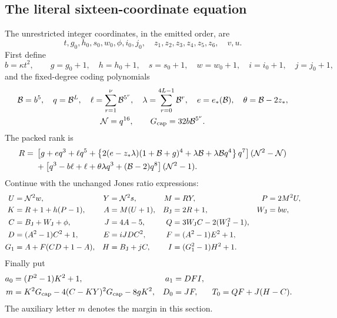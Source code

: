 \subsection{The literal sixteen-coordinate equation}

The unrestricted integer coordinates, in the emitted order, are
\begin{equation}
 t,g_0,h_0,s_0,w_0,\phi,i_0,j_0,\quad
 z_1,z_2,z_3,z_4,z_5,z_6,\quad v,u .
 \label{eq:s16-coordinates}
\end{equation}
First define
\[
 b=\kappa t^2,\qquad
 g=g_0+1,\quad h=h_0+1,\quad s=s_0+1,\quad
 w=w_0+1,\quad i=i_0+1,\quad j=j_0+1,
\]
and the fixed-degree coding polynomials
\begin{gather}
 {\cal B}=b^5,\quad q={\cal B}^{L},\quad
 \ell=\sum_{r=1}^{\nu}{\cal B}^{5^r},\quad
 \lambda=\sum_{r=0}^{4L-1}{\cal B}^{r},\quad
 e=e_*({\cal B}),\quad \theta={\cal B}-2z_*,\notag\\
 {\cal N}=q^{16},\qquad G_{\rm cap}=32b{\cal B}^{5^\nu}.
 \label{eq:s16-coding}
\end{gather}
The packed rank is
\begin{align}
 R={}&
 \left[
 g+eq^3+\ell q^5+
 \left\{
  2(e-z_*\lambda)(1+{\cal B}+g)^4+
  \lambda{\cal B}+\lambda{\cal B}q^4
 \right\}q^7
 \right]({\cal N}^2-{\cal N})\notag\\
 &+
 \left[
 q^3-b\ell+\ell+\theta\lambda q^3+({\cal B}-2)q^8
 \right]({\cal N}^2-1).
 \label{eq:s16-rank}
\end{align}
Continue with the unchanged Jones ratio expressions:
\begin{align}
 U&={\cal N}^2w,& Y&={\cal N}^2s,& M&=RY,&
 P&=2M^2U,\notag\\
 K&=R+1+h(P-1),&
 A&=M(U+1),&
 B_{\rm J}&=2R+1,& W_{\rm J}&=bw,\notag\\
 C&=B_{\rm J}+W_{\rm J}+\phi,&
 J&=4A-5,&
 Q&=3W_{\rm J}C-2(W_{\rm J}^2-1),\notag\\
 D&=(A^2-1)C^2+1,&
 E&=iJDC^2,&
 F&=(A^2-1)E^2+1,\notag\\
 G_1&=A+F(CD+1-A),&
 H&=B_{\rm J}+jC,&
 I&=(G_1^2-1)H^2+1.
 \label{eq:s16-ratio-block}
\end{align}
Finally put
\begin{align}
 a_0&=(P^2-1)K^2+1,&
 a_1&=DFI,\notag\\
 m&=K^2G_{\rm cap}
       -4(C-KY)^2G_{\rm cap}-8gK^2,&
 D_0&=JF,&
 T_0&=QF+J(H-C).
 \label{eq:s16-tests}
\end{align}
The auxiliary letter \(m\) denotes the margin in this section.

